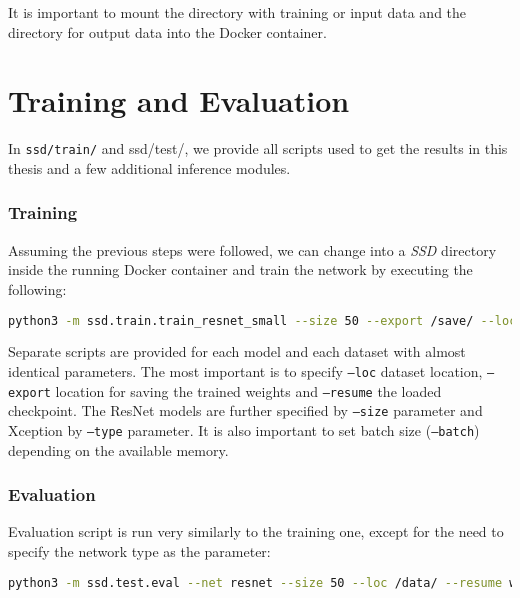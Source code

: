 It is important to mount the directory with training or input data and the directory for output data into the Docker container.


\section{Training and Evaluation}

In {\tt ssd/train/} and {ssd/test/}, we provide all scripts used to get the results in this thesis and a few additional inference modules. 

\subsubsection{Training}
Assuming the previous steps were followed, we can change into a \textit{SSD} directory inside the running Docker container and train the network by executing the following:

\begin{lstlisting}[breaklines, frame=single, language=Bash, basicstyle=\ttfamily]
  python3 -m ssd.train.train_resnet_small --size 50 --export /save/ --loc /data/ --resume imgnet
\end{lstlisting}

Separate scripts are provided for each model and each dataset with almost identical parameters. The most important is to specify {\tt --loc} dataset location, {\tt --export} location for saving the trained weights and {\tt --resume} the loaded checkpoint. The ResNet models are further specified by {\tt --size} parameter and Xception by {\tt --type} parameter. It is also important to set batch size ({\tt --batch}) depending on the available memory. 

\subsubsection{Evaluation}
Evaluation script is run very similarly to the training one, except for the need to specify the network type as the parameter:
\begin{lstlisting}[breaklines, frame=single, language=Bash, basicstyle=\ttfamily]
  python3 -m ssd.test.eval --net resnet --size 50 --loc /data/ --resume weights --batch 16
\end{lstlisting}



